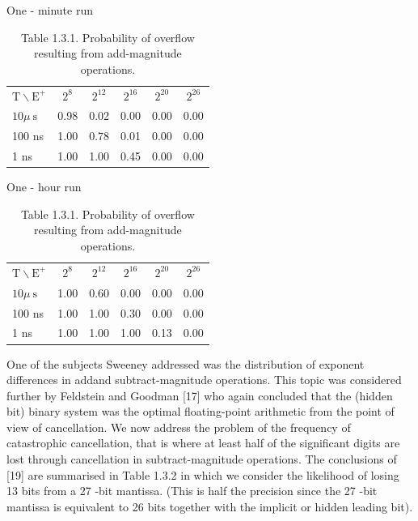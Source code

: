 \documentclass[10pt]{article}
\begin{document}
One - minute run

\begin{table}[h]
\begin{center}
\captionsetup{labelformat=empty}
\caption{Table 1.3.1. Probability of overflow resulting from add-magnitude operations.}
\begin{tabular}{lccccc}
$\mathrm{T} \backslash \mathrm{E}^{+}$ & $2^{8}$ & $2^{12}$ & $2^{16}$ & $2^{20}$ & $2^{26}$ \\
$10 \mu \mathrm{~s}$ & 0.98 & 0.02 & 0.00 & 0.00 & 0.00 \\
100 ns & 1.00 & 0.78 & 0.01 & 0.00 & 0.00 \\
1 ns & 1.00 & 1.00 & 0.45 & 0.00 & 0.00 \\
\end{tabular}
\end{center}
\end{table}

One - hour run

\begin{table}[h]
\begin{center}
\captionsetup{labelformat=empty}
\caption{Table 1.3.1. Probability of overflow resulting from add-magnitude operations.}
\begin{tabular}{lccccc}
$\mathrm{T} \backslash \mathrm{E}^{+}$ & $2^{8}$ & $2^{12}$ & $2^{16}$ & $2^{20}$ & $2^{26}$ \\
$10 \mu \mathrm{~s}$ & 1.00 & 0.60 & 0.00 & 0.00 & 0.00 \\
100 ns & 1.00 & 1.00 & 0.30 & 0.00 & 0.00 \\
1 ns & 1.00 & 1.00 & 1.00 & 0.13 & 0.00 \\
\end{tabular}
\end{center}
\end{table}

One of the subjects Sweeney addressed was the distribution of exponent differences in addand subtract-magnitude operations. This topic was considered further by Feldstein and Goodman [17] who again concluded that the (hidden bit) binary system was the optimal floating-point arithmetic from the point of view of cancellation. We now address the problem of the frequency of catastrophic cancellation, that is where at least half of the significant digits are lost through cancellation in subtract-magnitude operations. The conclusions of [19] are summarised in Table 1.3.2 in which we consider the likelihood of losing 13 bits from a 27 -bit mantissa. (This is half the precision since the 27 -bit mantissa is equivalent to 26 bits together with the implicit or hidden leading bit).
\end{document}
